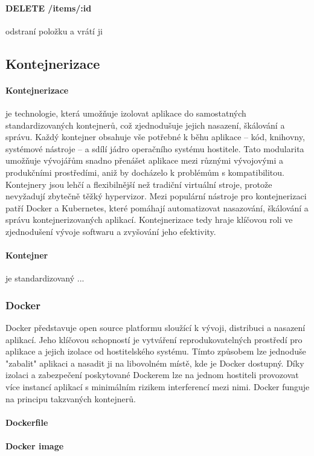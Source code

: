 \documentclass[12pt, a4paper]{article}
\begin{document}
\paragraph{DELETE /items/:id}
odstraní položku a vrátí ji
\subsection{Kontejnerizace}
\paragraph{Kontejnerizace}
je technologie, která umožňuje izolovat aplikace do samostatných standardizovaných kontejnerů, což zjednodušuje jejich nasazení, škálování a správu. Každý kontejner obsahuje vše potřebné k běhu aplikace – kód, knihovny, systémové nástroje – a sdílí jádro operačního systému hostitele. Tato modularita umožňuje vývojářům snadno přenášet aplikace mezi různými vývojovými a produkčními prostředími, aniž by docházelo k problémům s kompatibilitou. Kontejnery jsou lehčí a flexibilnější než tradiční virtuální stroje, protože nevyžadují zbytečně těžký hypervizor. Mezi populární nástroje pro kontejnerizaci patří Docker a Kubernetes, které pomáhají automatizovat nasazování, škálování a správu kontejnerizovaných aplikací. Kontejnerizace tedy hraje klíčovou roli ve zjednodušení vývoje softwaru a zvyšování jeho efektivity.
\paragraph{Kontejner}
je standardizovaný ...
\subsubsection{Docker}
Docker představuje open source platformu sloužící k vývoji, distribuci a nasazení aplikací. Jeho klíčovou schopností je vytváření reprodukovatelných prostředí pro aplikace a jejich izolace od hostitelského systému. Tímto způsobem lze jednoduše "zabalit" aplikaci a nasadit ji na libovolném místě, kde je Docker dostupný. Díky izolaci a zabezpečení poskytované Dockerem lze na jednom hostiteli provozovat více instancí aplikací s minimálním rizikem interferencí mezi nimi. Docker funguje na principu takzvaných kontejnerů.
\paragraph{Dockerfile}
\paragraph{Docker image}
\end{document}
